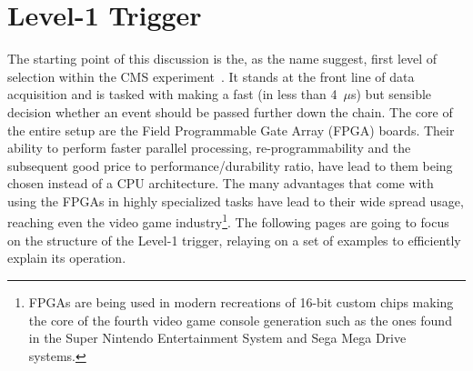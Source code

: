  \section{Level-1 Trigger}
 \hspace{10pt} The starting point of this discussion is the, as the name suggest, first level of selection within the CMS experiment~\cite{cms:l1_paper}. It stands at the front line of data acquisition and is tasked with making a fast (in less than 4~$\mu$s) but sensible decision whether an event should be passed further down the chain. The core of the entire setup are the Field Programmable Gate Array (FPGA) boards. Their ability to perform faster parallel processing, re-programmability and the subsequent good price to performance/durability ratio, have lead to them being chosen instead of a CPU architecture. The many advantages that come with using the FPGAs in highly specialized tasks have lead to their wide spread usage, reaching even the video game industry\footnote{FPGAs are being used in modern recreations of 16-bit custom chips making the core of the fourth video game console generation such as the ones found in the Super Nintendo Entertainment System and Sega Mega Drive systems.}. The following pages are going to focus on the structure of the Level-1 trigger, relaying on a set of examples to efficiently explain its operation.
 

